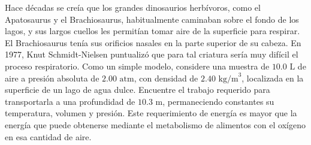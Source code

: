 \item Hace décadas se creía que los grandes dinosaurios herbívoros, como el Apatosaurus y el Brachiosaurus, habitualmente caminaban sobre el fondo de los lagos, y sus largos cuellos les permitían tomar aire de la superficie para respirar. El Brachiosaurus tenía sus orificios nasales en la parte superior de su cabeza. En 1977, Knut Schmidt-Nielsen puntualizó que para tal criatura sería muy difícil el proceso respiratorio. Como un simple modelo, considere una muestra de $10.0 \text{ L}$ de aire a presión absoluta de $2.00 \text{ atm}$, con densidad de $2.40 \text{ kg/m}^3$, localizada en la superficie de un lago de agua dulce. Encuentre el trabajo requerido para transportarla a una profundidad de $10.3 \text{ m}$, permaneciendo constantes su temperatura, volumen y presión. Este requerimiento de energía es mayor que la energía que puede obtenerse mediante el metabolismo de alimentos con el oxígeno en esa cantidad de aire.
